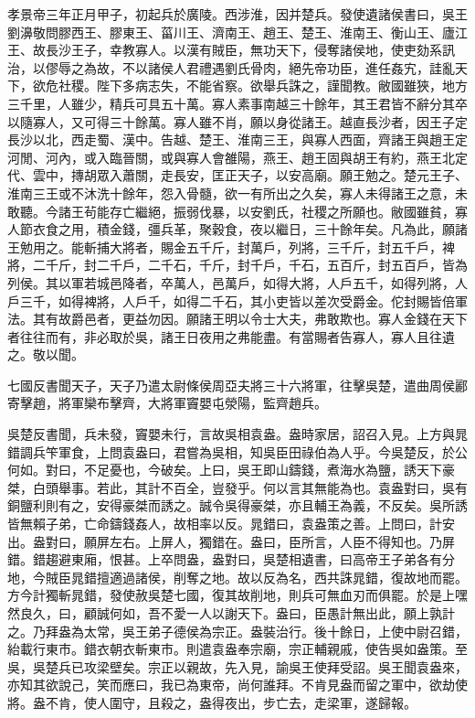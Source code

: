 孝景帝三年正月甲子，初起兵於廣陵。西涉淮，因并楚兵。發使遺諸侯書曰，吳王劉濞敬問膠西王、膠東王、菑川王、濟南王、趙王、楚王、淮南王、衡山王、廬江王、故長沙王子，幸教寡人。以漢有賊臣，無功天下，侵奪諸侯地，使吏劾系訊治，以僇辱之為故，不以諸侯人君禮遇劉氏骨肉，絕先帝功臣，進任姦宄，詿亂天下，欲危社稷。陛下多病志失，不能省察。欲舉兵誅之，謹聞教。敝國雖狹，地方三千里，人雖少，精兵可具五十萬。寡人素事南越三十餘年，其王君皆不辭分其卒以隨寡人，又可得三十餘萬。寡人雖不肖，願以身從諸王。越直長沙者，因王子定長沙以北，西走蜀、漢中。告越、楚王、淮南三王，與寡人西面，齊諸王與趙王定河閒、河內，或入臨晉關，或與寡人會雒陽，燕王、趙王固與胡王有約，燕王北定代、雲中，摶胡眾入蕭關，走長安，匡正天子，以安高廟。願王勉之。楚元王子、淮南三王或不沐洗十餘年，怨入骨髓，欲一有所出之久矣，寡人未得諸王之意，未敢聽。今諸王茍能存亡繼絕，振弱伐暴，以安劉氏，社稷之所願也。敝國雖貧，寡人節衣食之用，積金錢，彊兵革，聚穀食，夜以繼日，三十餘年矣。凡為此，願諸王勉用之。能斬捕大將者，賜金五千斤，封萬戶，列將，三千斤，封五千戶，裨將，二千斤，封二千戶，二千石，千斤，封千戶，千石，五百斤，封五百戶，皆為列侯。其以軍若城邑降者，卒萬人，邑萬戶，如得大將，人戶五千，如得列將，人戶三千，如得裨將，人戶千，如得二千石，其小吏皆以差次受爵金。佗封賜皆倍軍法。其有故爵邑者，更益勿因。願諸王明以令士大夫，弗敢欺也。寡人金錢在天下者往往而有，非必取於吳，諸王日夜用之弗能盡。有當賜者告寡人，寡人且往遺之。敬以聞。

七國反書聞天子，天子乃遣太尉條侯周亞夫將三十六將軍，往擊吳楚，遣曲周侯酈寄擊趙，將軍欒布擊齊，大將軍竇嬰屯滎陽，監齊趙兵。

吳楚反書聞，兵未發，竇嬰未行，言故吳相袁盎。盎時家居，詔召入見。上方與晁錯調兵笇軍食，上問袁盎曰，君嘗為吳相，知吳臣田祿伯為人乎。今吳楚反，於公何如。對曰，不足憂也，今破矣。上曰，吳王即山鑄錢，煮海水為鹽，誘天下豪桀，白頭舉事。若此，其計不百全，豈發乎。何以言其無能為也。袁盎對曰，吳有銅鹽利則有之，安得豪桀而誘之。誠令吳得豪桀，亦且輔王為義，不反矣。吳所誘皆無賴子弟，亡命鑄錢姦人，故相率以反。晁錯曰，袁盎策之善。上問曰，計安出。盎對曰，願屏左右。上屏人，獨錯在。盎曰，臣所言，人臣不得知也。乃屏錯。錯趨避東廂，恨甚。上卒問盎，盎對曰，吳楚相遺書，曰高帝王子弟各有分地，今賊臣晁錯擅適過諸侯，削奪之地。故以反為名，西共誅晁錯，復故地而罷。方今計獨斬晁錯，發使赦吳楚七國，復其故削地，則兵可無血刃而俱罷。於是上嘿然良久，曰，顧誠何如，吾不愛一人以謝天下。盎曰，臣愚計無出此，願上孰計之。乃拜盎為太常，吳王弟子德侯為宗正。盎裝治行。後十餘日，上使中尉召錯，紿載行東市。錯衣朝衣斬東市。則遣袁盎奉宗廟，宗正輔親戚，使告吳如盎策。至吳，吳楚兵已攻梁壁矣。宗正以親故，先入見，諭吳王使拜受詔。吳王聞袁盎來，亦知其欲說己，笑而應曰，我已為東帝，尚何誰拜。不肯見盎而留之軍中，欲劫使將。盎不肯，使人圍守，且殺之，盎得夜出，步亡去，走梁軍，遂歸報。

